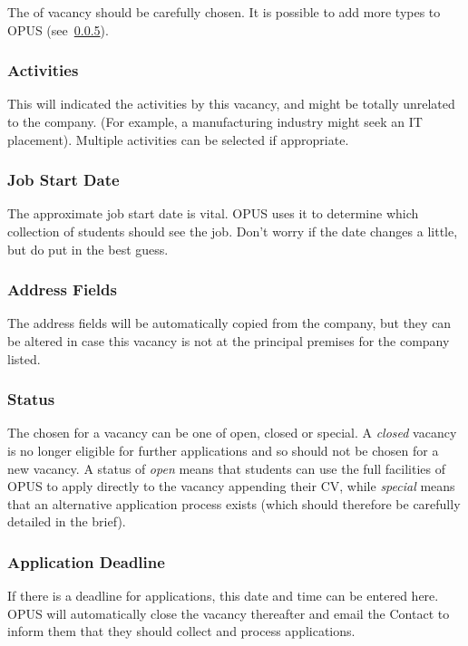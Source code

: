 \documentclass[12 pt]{book}
\begin{document}
The  of vacancy should be carefully chosen. It is possible to
add more types to OPUS (see~\ref{}).

\subsubsection{Activities}

This will indicated the activities by this vacancy, and might be totally
unrelated to the company. (For example, a manufacturing industry might seek
an IT placement). Multiple activities can be selected if appropriate.

\subsubsection{Job Start Date}

The approximate job start date is vital. OPUS uses it to determine which
collection of students should see the job. Don't worry if the date changes a
little, but do put in the best guess.

\subsubsection{Address Fields}

The address fields will be automatically copied from the company, but they can
be altered in case this vacancy is not at the principal premises for the 
company listed.

\subsubsection{Status}

The  chosen for a vacancy can be one of open, closed or 
special. A \emph{closed} vacancy is no longer eligible for further applications
and so should not be chosen for a new vacancy. A status of \emph{open} means 
that students can use the full facilities of OPUS to apply directly to the
vacancy appending their CV, while \emph{special} means that an alternative
application process exists (which should therefore be carefully detailed in the
brief).

\subsubsection{Application Deadline}

If there is a deadline for applications, this date and time can be entered 
here. OPUS will automatically close the vacancy thereafter and email the
Contact to inform them that they should collect and process applications.
\end{document}
